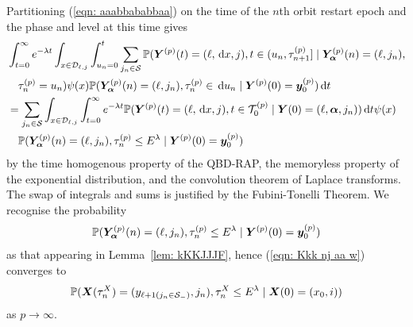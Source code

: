 Partitioning (\ref{eqn: aaabbababbaa}) on the time of the \(n\)th orbit restart epoch and the phase and level at this time gives
\begin{align}
	&\int_{t=0}^\infty e^{-\lambda t} 
	\int_{x\in\mathcal{D}_{\ell,j}}
	\int_{u_n=0}^t\sum_{j_n\in\mathcal S} \mathbb P({\boldsymbol Y}^{(p)}(t) = (\ell,\, \mathrm{d} x,j), 
	t \in(u_n, \tau_{n+1}^{(p)}] \mid\bm{Y}_{\bm{\alpha}}^{(p)}(n) = (\ell,j_n), \nonumber 
	\\&\quad \tau_{n}^{(p)}= u_n)\psi(x) \mathbb P(\bm{Y}_{\bm{\alpha}}^{(p)}(n) = (\ell, j_n), \tau_{n}^{(p)}\in \, \mathrm{d} u_n 
	 \mid \boldsymbol Y^{(p)}(0)=\boldsymbol y_0^{(p)}) 
	  \, \mathrm{d} t \nonumber 
	 \\&= \sum_{j_n\in\mathcal S}
	\int_{x\in\mathcal{D}_{\ell,j}} \int_{t=0}^\infty e^{-\lambda t} \mathbb P({\boldsymbol Y}^{(p)}(t) = (\ell,\, \mathrm{d} x, j), 
	t\in\mathcal T_{0}^{(p)} \mid\nonumber 
	  \boldsymbol Y(0) = (\ell,\boldsymbol\alpha,j_n))\, \mathrm{d} t \psi(x)  
	  \\&\quad{} \mathbb P(\bm{Y}_{\bm{\alpha}}^{(p)}(n) = (\ell,j_n), \tau_{n}^{(p)}\leq E^\lambda 
	 \mid \boldsymbol Y^{(p)}(0)=\boldsymbol y_0^{(p)}) \label{eqn: l whkrqvlkjbrd}
\end{align}
by the time homogenous property of the QBD-RAP, the memoryless property of the exponential distribution, and the convolution theorem of Laplace transforms. The swap of integrals and sums is justified by the Fubini-Tonelli Theorem. We recognise the probability 
\begin{align}
	\mathbb P(\bm{Y}_{\bm{\alpha}}^{(p)}(n) = (\ell, j_n), \tau_{n}^{(p)}\leq E^\lambda 
	 \mid \boldsymbol Y^{(p)}(0)=\boldsymbol y_0^{(p)}) \label{eqn: Kkk nj aa w}
\end{align}
as that appearing in Lemma~\ref{lem: kKKJJJF}, hence (\ref{eqn: Kkk nj aa w}) converges to 
\begin{align}
	\mathbb P(\boldsymbol X(\tau_n^X) = (y_{\ell+1(j_{n}\in\mathcal S_-)}, 
		j_n), \tau_{n}^X\leq E^\lambda
		\mid \boldsymbol X(0)=(x_0, i)) \label{eqn: ashverkjbvjhkhdsknacva}
\end{align}
as \(p\to\infty\). 

